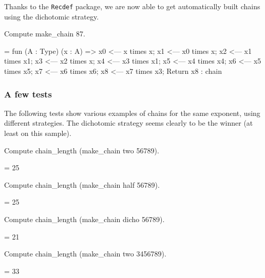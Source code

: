 Thanks to the \texttt{Recdef} package, we are now able to get automatically 
built chains using the dichotomic strategy.


\begin{Coqsrc}
Compute make_chain 87.
\end{Coqsrc}

\begin{Coqanswer}
 =  fun (A : Type) (x : A) =>
       x0 <--- x times x;
       x1 <--- x0 times x;
       x2 <--- x1 times x1;
       x3 <--- x2 times x;
       x4 <--- x3 times x1;
       x5 <--- x4 times x4;
       x6 <--- x5 times x5;
       x7 <--- x6 times x6; 
       x8 <--- x7 times x3; 
       Return x8
     : chain 
\end{Coqanswer}


\subsubsection{A few tests}
\label{sect:test-strat}

The following tests show various examples of chains for the same exponent, using different strategies. The dichotomic strategy seems clearly to be the winner (at least on this sample).

\begin{Coqsrc}
Compute chain_length (make_chain two 56789).
\end{Coqsrc}

\begin{Coqanswer}
= 25%
\end{Coqanswer}

\begin{Coqsrc}
Compute chain_length (make_chain half 56789).
\end{Coqsrc}

\begin{Coqanswer}
 = 25%
\end{Coqanswer}

\begin{Coqsrc}
Compute chain_length (make_chain dicho 56789).
\end{Coqsrc}

\begin{Coqanswer}
= 21%
\end{Coqanswer}

\begin{Coqsrc}
Compute chain_length (make_chain two 3456789).
\end{Coqsrc}

\begin{Coqanswer}
= 33%
\end{Coqanswer}

